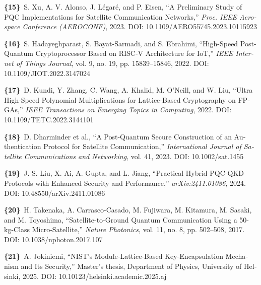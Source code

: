 \documentclass[a4paper,14pt]{extreport}
\begin{document}
\begin{latin}
\begin{flushleft}
\vspace{2pt}

\noindent\textbf{\{15\}}~S. Xu, A. V. Alonso, J. L\'egar\'e, and P. Eisen, ``A Preliminary Study of PQC Implementations for Satellite Communication Networks,'' \textit{Proc. IEEE Aerospace Conference (AEROCONF)}, 2023. DOI: 10.1109/AERO55745.2023.10115923

\vspace{2pt}

\noindent\textbf{\{16\}}~S. Hadayeghparast, S. Bayat-Sarmadi, and S. Ebrahimi, ``High-Speed Post-Quantum Cryptoprocessor Based on RISC-V Architecture for IoT,'' \textit{IEEE Internet of Things Journal}, vol. 9, no. 19, pp. 15839--15846, 2022. DOI: 10.1109/JIOT.2022.3147024

\vspace{2pt}

\noindent\textbf{\{17\}}~D. Kundi, Y. Zhang, C. Wang, A. Khalid, M. O'Neill, and W. Liu, ``Ultra High-Speed Polynomial Multiplications for Lattice-Based Cryptography on FPGAs,'' \textit{IEEE Transactions on Emerging Topics in Computing}, 2022. DOI: 10.1109/TETC.2022.3144101

\vspace{2pt}

\noindent\textbf{\{18\}}~D. Dharminder et al., ``A Post-Quantum Secure Construction of an Authentication Protocol for Satellite Communication,'' \textit{International Journal of Satellite Communications and Networking}, vol. 41, 2023. DOI: 10.1002/sat.1455

\vspace{2pt}

\noindent\textbf{\{19\}}~J. S. Liu, X. Ai, A. Gupta, and L. Jiang, ``Practical Hybrid PQC-QKD Protocols with Enhanced Security and Performance,'' \textit{arXiv:2411.01086}, 2024. DOI: 10.48550/arXiv.2411.01086

\vspace{2pt}

\noindent\textbf{\{20\}}~H. Takenaka, A. Carrasco-Casado, M. Fujiwara, M. Kitamura, M. Sasaki, and M. Toyoshima, ``Satellite-to-Ground Quantum Communication Using a 50-kg-Class Micro-Satellite,'' \textit{Nature Photonics}, vol. 11, no. 8, pp. 502--508, 2017. DOI: 10.1038/nphoton.2017.107

\vspace{2pt}

\noindent\textbf{\{21\}}~A. Jokiniemi, ``NIST's Module-Lattice-Based Key-Encapsulation Mechanism and Its Security,'' Master's thesis, Department of Physics, University of Helsinki, 2025. DOI: 10.10123/helsinki.academic.2025.aj


\end{flushleft}
\end{latin}
\end{document}
